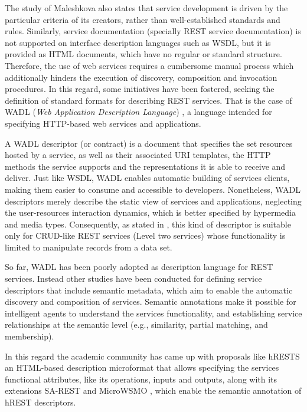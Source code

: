 The study of Maleshkova also states that service development is driven by the particular criteria of its creators, rather than well-established standards and rules. Similarly, service documentation (specially REST service documentation) is not supported on interface description languages such as WSDL, but it is provided as HTML documents, which have no regular or standard structure. Therefore, the use of web services requires a cumbersome manual process which additionally hinders the execution of discovery, composition and invocation procedures. In this regard, some initiatives have been fostered, seeking the definition of standard formats for describing REST services. That is the case of WADL (\emph{Web Application Description Language}) \cite{W3C:2009}, a language intended for specifying HTTP-based web services and applications.

A WADL descriptor (or contract) is a document that specifies the set resources hosted by a service, as well as their associated URI templates, the HTTP methods the service supports and the representations it is able to receive and deliver. Just like WSDL, WADL enables automatic building of services clients, making them easier to consume and accessible to developers. Nonetheless, WADL descriptors merely describe the static view of services and applications, neglecting the user-resources interaction dynamics, which is better specified by hypermedia and media types. Consequently, as stated in \cite{Webber:2010b}, this kind of descriptor is suitable only for CRUD-like REST services (Level two services) whose functionality is limited to manipulate records from a data set.

So far, WADL has been poorly adopted as description language for REST services. Instead other studies have been conducted for defining service descriptors that include semantic metadata, which aim to enable the automatic discovery and composition of services. Semantic annotations make it possible for intelligent agents to understand the services functionality, and establishing service relationships at the semantic level (e.g., similarity, partial matching, and membership\cite{Paolucci:2002}).

In this regard the academic community has came up with proposals like hRESTS \cite{Kopecky:2008}\textemdash{}an HTML-based description microformat that allows specifying the services functional attributes, like its operations, inputs and outputs\textemdash{}, along with its extensions SA-REST \cite{Sheth:2007} and MicroWSMO \cite{Kopecky:2009}, which enable the semantic annotation of hREST descriptors.

